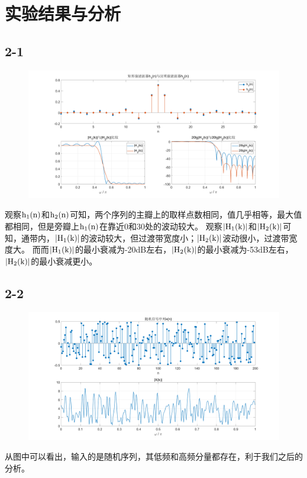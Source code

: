 \documentclass{../source/Experiment}
\begin{document}
\section{实验结果与分析}
\subsection{2-1}
\begin{figure}[H]
    \centering
    \includegraphics[width = 1\textwidth]{src/exp4-2-1.png}
\end{figure}
观察$\rm h_1(n)$和$\rm h_2(n)$可知，两个序列的主瓣上的取样点数相同，值几乎相等，最大值都相同，但是旁瓣上$\rm h_1(n)$在靠近0和30处的波动较大。
观察$\rm |H_1(k)|$和$\rm |H_2(k)|$可知，通带内，$\rm |H_1(k)|$的波动较大，但过渡带宽度小；$\rm |H_2(k)|$波动很小，过渡带宽度大。
而而$\rm |H_1(k)|$的最小衰减为-20dB左右，$\rm |H_2(k)|$的最小衰减为-53dB左右，$\rm |H_2(k)|$的最小衰减更小。

\subsection{2-2}
\begin{figure}[H]
    \centering
    \includegraphics[width = 1\textwidth]{src/exp4-2-2.png}
\end{figure}
从图中可以看出，输入的是随机序列，其低频和高频分量都存在，利于我们之后的分析。
\end{document}
